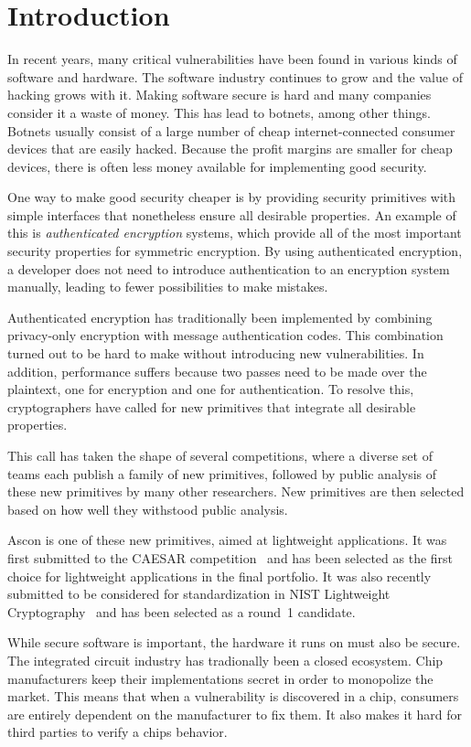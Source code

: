 \section{Introduction}

In recent years, many critical vulnerabilities have been found in various kinds
of software and hardware. The software industry continues to grow and the value
of hacking grows with it. Making software secure is hard and many companies
consider it a waste of money. This has lead to botnets, among other things.
Botnets usually consist of a large number of cheap internet-connected consumer
devices that are easily hacked. Because the profit margins are smaller for cheap
devices, there is often less money available for implementing good security.

One way to make good security cheaper is by providing security primitives with
simple interfaces that nonetheless ensure all desirable properties. An example
of this is \emph{authenticated encryption} systems, which provide all of the
most important security properties for symmetric encryption. By using
authenticated encryption, a developer does not need to introduce authentication
to an encryption system manually, leading to fewer possibilities to make
mistakes.

Authenticated encryption has traditionally been implemented by combining
privacy-only encryption with message authentication codes. This combination
turned out to be hard to make without introducing new vulnerabilities. In
addition, performance suffers because two passes need to be made over the
plaintext, one for encryption and one for authentication. To resolve this,
cryptographers have called for new primitives that integrate all desirable
properties.

This call has taken the shape of several competitions, where a diverse set of
teams each publish a family of new primitives, followed by public analysis of
these new primitives by many other researchers. New primitives are then selected
based on how well they withstood public analysis.

Ascon is one of these new primitives, aimed at lightweight applications. It was
first submitted to the CAESAR competition~\cite{caesar} and has been selected as
the first choice for lightweight applications in the final portfolio. It was
also recently submitted to be considered for standardization in NIST Lightweight
Cryptography~\cite{nistlc} and has been selected as a round~1 candidate.

While secure software is important, the hardware it runs on must also be secure.
The integrated circuit industry has tradionally been a closed ecosystem. Chip
manufacturers keep their implementations secret in order to monopolize the
market. This means that when a vulnerability is discovered in a chip, consumers
are entirely dependent on the manufacturer to fix them. It also makes it hard
for third parties to verify a chips behavior.

